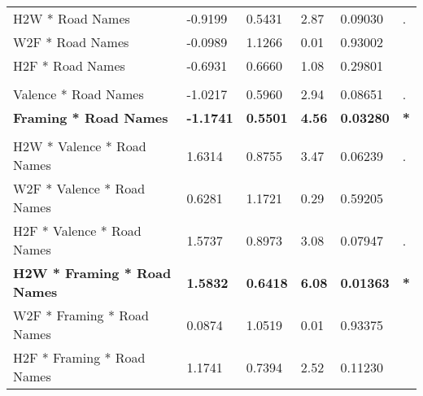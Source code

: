 \begin{table}[t]
\begin{tabular}{llllll}
        H2W * Road Names & -0.9199 & 0.5431 & 2.87 & 0.09030 & . \\
        W2F * Road Names & -0.0989 & 1.1266 & 0.01 & 0.93002 & \\
        H2F * Road Names & -0.6931 & 0.6660 & 1.08 & 0.29801 & \\
        & & & & & \\
        Valence * Road Names & -1.0217 & 0.5960 & 2.94 & 0.08651 & . \\
        \textbf{Framing * Road Names} & \textbf{-1.1741} & \textbf{0.5501} & \textbf{4.56}  & \textbf{0.03280} & \textbf{*}   \\
        & & & & & \\
        H2W * Valence * Road Names & 1.6314 & 0.8755 & 3.47 & 0.06239 & . \\
        W2F * Valence * Road Names & 0.6281 & 1.1721 & 0.29 & 0.59205 & \\
        H2F * Valence * Road Names & 1.5737 & 0.8973 & 3.08 & 0.07947 & . \\
        \textbf{H2W * Framing * Road Names} & \textbf{1.5832} & \textbf{0.6418} & \textbf{6.08}  & \textbf{0.01363} & \textbf{*}   \\
        W2F * Framing * Road Names & 0.0874 & 1.0519 & 0.01 & 0.93375 & \\
        H2F * Framing * Road Names & 1.1741 & 0.7394 & 2.52 & 0.11230 & \\
        \hline
    \end{tabular}
\end{table}

